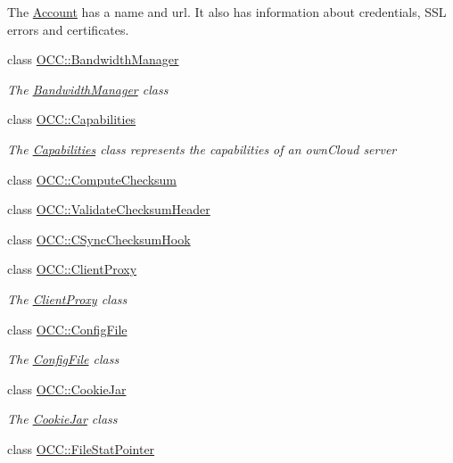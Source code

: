 \begin{DoxyCompactItemize}
\begin{DoxyCompactList}
The \hyperlink{class_o_c_c_1_1_account}{Account} has a name and url. It also has information about credentials, S\+SL errors and certificates. \end{DoxyCompactList}\item 
class \hyperlink{class_o_c_c_1_1_bandwidth_manager}{O\+C\+C\+::\+Bandwidth\+Manager}
\begin{DoxyCompactList}\small\item\em The \hyperlink{class_o_c_c_1_1_bandwidth_manager}{Bandwidth\+Manager} class \end{DoxyCompactList}\item 
class \hyperlink{class_o_c_c_1_1_capabilities}{O\+C\+C\+::\+Capabilities}
\begin{DoxyCompactList}\small\item\em The \hyperlink{class_o_c_c_1_1_capabilities}{Capabilities} class represents the capabilities of an own\+Cloud server \end{DoxyCompactList}\item 
class \hyperlink{class_o_c_c_1_1_compute_checksum}{O\+C\+C\+::\+Compute\+Checksum}
\item 
class \hyperlink{class_o_c_c_1_1_validate_checksum_header}{O\+C\+C\+::\+Validate\+Checksum\+Header}
\item 
class \hyperlink{class_o_c_c_1_1_c_sync_checksum_hook}{O\+C\+C\+::\+C\+Sync\+Checksum\+Hook}
\item 
class \hyperlink{class_o_c_c_1_1_client_proxy}{O\+C\+C\+::\+Client\+Proxy}
\begin{DoxyCompactList}\small\item\em The \hyperlink{class_o_c_c_1_1_client_proxy}{Client\+Proxy} class \end{DoxyCompactList}\item 
class \hyperlink{class_o_c_c_1_1_config_file}{O\+C\+C\+::\+Config\+File}
\begin{DoxyCompactList}\small\item\em The \hyperlink{class_o_c_c_1_1_config_file}{Config\+File} class \end{DoxyCompactList}\item 
class \hyperlink{class_o_c_c_1_1_cookie_jar}{O\+C\+C\+::\+Cookie\+Jar}
\begin{DoxyCompactList}\small\item\em The \hyperlink{class_o_c_c_1_1_cookie_jar}{Cookie\+Jar} class \end{DoxyCompactList}\item 
class \hyperlink{class_o_c_c_1_1_file_stat_pointer}{O\+C\+C\+::\+File\+Stat\+Pointer}

\end{DoxyCompactItemize}
